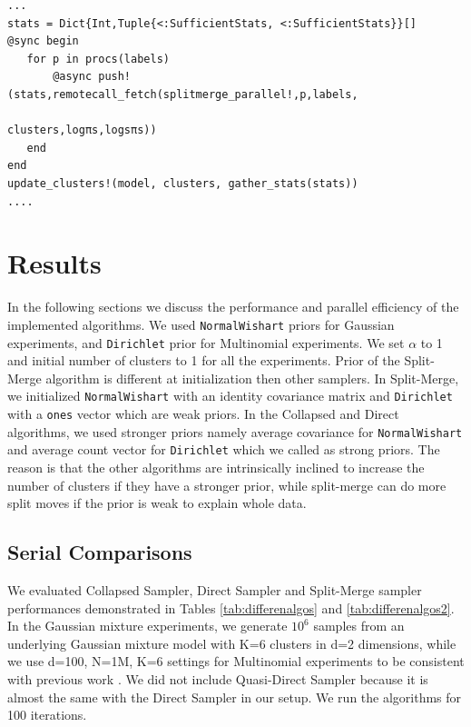 \documentclass[12pt, a4paper]{article}
\newenvironment{code}{\captionsetup{type=listing}}{}
\begin{document}
\begin{code}
\begin{verbatim}
...
stats = Dict{Int,Tuple{<:SufficientStats, <:SufficientStats}}[]
@sync begin
   for p in procs(labels)
       @async push!(stats,remotecall_fetch(splitmerge_parallel!,p,labels,
                                                    clusters,logπs,logsπs))
   end
end
update_clusters!(model, clusters, gather_stats(stats))
....
\end{verbatim}
\label{code:parallelwork}
\end{code}


\section{Results}

In the following sections we discuss the performance and parallel efficiency of the implemented algorithms. We used \texttt{NormalWishart} priors for Gaussian experiments, and \texttt{Dirichlet} prior for Multinomial experiments. We set $\alpha$ to 1 and initial number of clusters to 1 for all the experiments. Prior of the Split-Merge algorithm is different at initialization then other samplers. In Split-Merge, we initialized \texttt{NormalWishart} with an identity covariance matrix and \texttt{Dirichlet} with a \texttt{ones} vector which are weak priors. In the Collapsed and Direct algorithms, we used stronger priors namely average covariance for \texttt{NormalWishart} and average count vector for \texttt{Dirichlet} which we called as strong priors. The reason is that the other algorithms are intrinsically inclined to increase the number of clusters if they have a stronger prior, while split-merge can do more split moves if the prior is weak to explain whole data.

\subsection{Serial Comparisons}
We evaluated Collapsed Sampler, Direct Sampler and Split-Merge sampler performances demonstrated in Tables \ref{tab:differenalgos} and \ref{tab:differenalgos2}. In the Gaussian mixture experiments, we generate $10^6$ samples from an underlying Gaussian mixture model with K=6 clusters in d=2 dimensions, while we use d=100, N=1M, K=6 settings for Multinomial experiments to be consistent with previous work \cite{yu2016parallel}. We did not include Quasi-Direct Sampler because it is almost the same with the Direct Sampler in our setup. We run the algorithms for 100 iterations.
\end{document}
